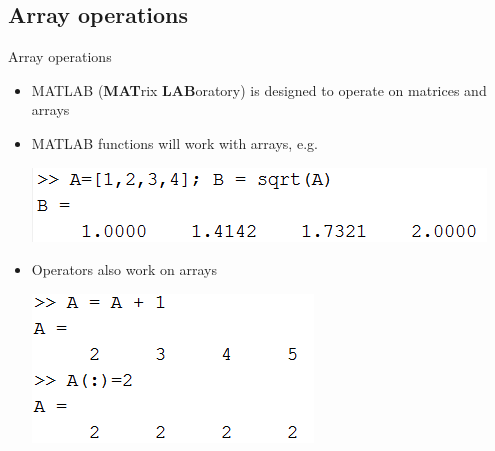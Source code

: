 \documentclass{beamer}
\begin{document}
\subsection{Array operations}
\begin{frame}{Array operations}{}
	\begin{itemize}
		\item MATLAB (\textbf{MAT}rix \textbf{LAB}oratory) is designed to operate on matrices and arrays
		\item MATLAB functions will work with arrays, e.g.
		
		\includegraphics[scale=0.7]{array_operations_sqrt}
		
		\item Operators also work on arrays
		
		\includegraphics[scale=0.7]{array_operators}
	\end{itemize}
\end{frame}
\end{document}
